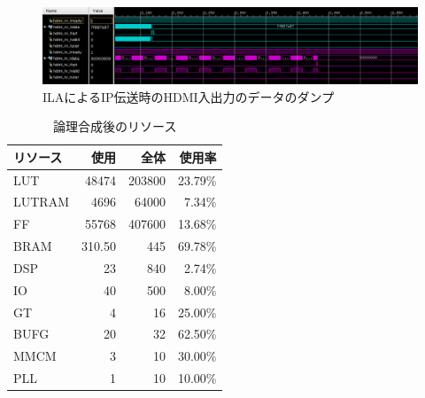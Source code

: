 
\begin{figure}[htbp]
  \begin{center}
    \includegraphics[bb=0 0 1199 246,width=22.5cm,angle=270]{img/fpga-ila-hdmi.png}
  \end{center}
  \caption{ILAによるIP伝送時のHDMI入出力のデータのダンプ}
  \label{fig:fpga-ila-hdmi}
\end{figure}


\begin{table}[htbp]
  \caption{論理合成後のリソース}
  \label{tb:fpga-post-implementation-utilization}
  \begin{center}
  \begin{tabular}{l|r|r|r}
    \hline
    リソース  & 使用    & 全体    & 使用率   \\\hline\hline
    LUT      &  48474 & 203800 & 23.79\% \\\hline
    LUTRAM   &   4696 &  64000 &  7.34\% \\\hline
    FF       &  55768 & 407600 & 13.68\% \\\hline
    BRAM     & 310.50 &    445 & 69.78\% \\\hline
    DSP      &     23 &    840 &  2.74\% \\\hline
    IO       &     40 &    500 &  8.00\% \\\hline
    GT       &      4 &     16 & 25.00\% \\\hline
    BUFG     &     20 &     32 & 62.50\% \\\hline
    MMCM     &      3 &     10 & 30.00\% \\\hline
    PLL      &      1 &     10 & 10.00\% \\\hline
  \end{tabular}\end{center}
\end{table}
